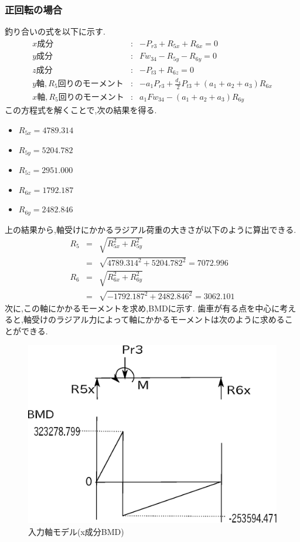 \documentclass[a4j,twoside,openright,11pt]{jreport}
\begin{document}
\subsubsection{正回転の場合}
釣り合いの式を以下に示す.
\begin{eqnarray}
x成分&:&-P_{r3}+R_{5x}+R_{6x}=0\\
y成分&:&Fw_{34}-R_{5y}-R_{6y}=0\\
z成分&:&-P_{t3}+R_{6z}=0\\
y軸,R_5回りのモーメント&:&-a_1P_{r3}+\frac{d_4}{2}P_{t3}+(a_1+a_2+a_3)R_{6x}\\
x軸,R_5回りのモーメント&:&a_1Fw_{34}-(a_1+a_2+a_3)R_{6y}
\end{eqnarray}
この方程式を解くことで,次の結果を得る.
\begin{itemize}
\item $R_{5x}=4789.314$
\item $R_{5y}=5204.782$
\item $R_{5z}=2951.000$
\item $R_{6x}=1792.187$
\item $R_{6y}=2482.846$
\end{itemize}
上の結果から,軸受けにかかるラジアル荷重の大きさが以下のように算出できる.
\begin{eqnarray}
R_5 &=& \sqrt {R_{5x}^2+R_{5y}^2}\\
    &=& \sqrt {4789.314^2+5204.782^2}=7072.996\\
R_6 &=& \sqrt {R_{6x}^2+R_{6y}^2}\\
    &=& \sqrt {-1792.187^2+2482.846^2}=3062.101
\end{eqnarray}
次に,この軸にかかるモーメントを求め,BMDに示す.
歯車が有る点を中心に考えると,軸受けのラジアル力によって軸にかかるモーメントは次のように求めることができる.
\begin{figure}[htbp]
\begin{center}
\includegraphics[width=12cm]{jiku34.eps}
\end{center}
\caption{入力軸モデル(x成分BMD)}
\end{figure}
\end{document}
